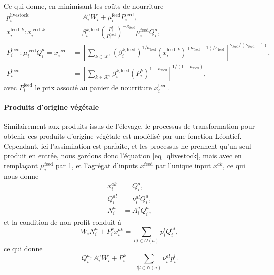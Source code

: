 Ce qui donne, en minimisant les coûts de nourriture
\begin{align}
    p_i^{\text{livestock}}                                                            & = A_i^a W_i + \mu^\text{feed}_i P^{\text{feed}}_i,
    \\
    \label{eq_xfeedik} x^{\text{feed},k}_i : x^{\text{feed},k}_i                      & = \beta_i^{k, \text{feed}} \left( \frac{P_i^k}{P^{\text{feed}}_i} \right)^{-\kappa_{\text{feed}}} \mu^\text{feed}_i Q_i^a,                                                                                                \\
    \label{eq_pfeedi} P_i^\text{feed} : \mu^{\text{feed}}_i Q_i^a = x^{\text{feed}}_i & = \left[\sum_{k \in \mathcal{K}^c} (\beta_i^{k, \text{feed}})^{1/\kappa_{\text{feed}}} (x^{\text{feed},k}_i)^{(\kappa_{\text{feed}} - 1)/\kappa_{\text{feed}}} \right]^{\kappa_{\text{feed}}/(\kappa_{\text{feed}} - 1)},
    \\
    P^{\text{feed}}_i                                                                 & = \left[ \sum_{k \in \mathcal{K}^c} \beta_i^{k, \text{feed}} (P_i^k)^{1 - \kappa_{\text{feed}}}\right]^{1/(1 - \kappa_{\text{feed}})},
\end{align}
avec $P_i^\text{feed}$ le prix associé au panier de nourriture $x_i^\text{feed}$.

\paragraph{Produits d’origine végétale} Similairement aux produits issus de l’élevage, le processus de transformation pour obtenir ces produits d’origine végétale est modélisé par une fonction Léontief. Cependant, ici l’assimilation est parfaite, et les processus ne prennent qu’un seul produit en entrée, nous gardons donc l’équation \ref{eq_qlivestock}, mais avec en remplaçant $\mu_i^\text{feed}$ par 1, et l’agrégat d’inputs $x^{\text{feed}}$ par l’unique input $x^{ak}$, ce qui nous donne
\begin{align}
    \label{eq_xiak} x^{ak}_i & = Q_i^a,            \\
    Q_i^{al}                 & = \nu_i^{al} Q_i^a, \\
    \label{eq_nia}   N_i^a   & = A_i^a Q_i^a,
\end{align}
et la condition de non-profit conduit à
\begin{equation}
    W_i N_i^a + P_i^k x_i^{ak} = \sum_{{l|l\in \mathcal{O}(a)}} p_i^l Q_i^{al},
\end{equation}
ce qui donne
\begin{equation}\label{eq_qia}
    Q_i^a: A_i^a W_i + P_i^k = \sum_{l|l\in \mathcal{O}(a)} \nu_i^{al} p_i^{l}.
\end{equation}

